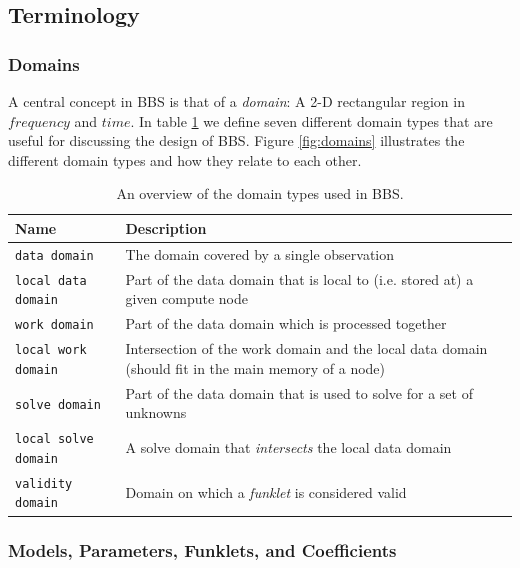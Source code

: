 \documentclass[10pt]{lofar}
\begin{document}
\subsection{Terminology}
\label{subsec:terminology}

\subsubsection{Domains}
\label{subsubsec:domains}

A central concept in BBS is that of a \emph{domain}: A 2-D rectangular region in
$frequency$ and $time$. In table \ref{tab:domains} we define seven different
domain types that are useful for discussing the design of BBS. Figure
\ref{fig:domains} illustrates the different domain types and how they relate to
each other.

\begin{table}[htb!]
\centering
\begin{tabular}{lp{}}
\hline
\textbf{Name} & \textbf{Description}\\
\hline
\texttt{data domain} & The domain covered by a single observation\\
\hline
\texttt{local data domain} & Part of the data domain that is local to (i.e.
stored at) a given compute node\\
\hline
\texttt{work domain} & Part of the data domain which is processed together\\
\hline
\texttt{local work domain} & Intersection of the work domain and the local data
domain (should fit in the main memory of a node)\\
\hline
\texttt{solve domain} & Part of the data domain that is used to solve for a set
of unknowns\\
\hline
\texttt{local solve domain} & A solve domain that \emph{intersects} the local
data domain\\
\hline
\texttt{validity domain} & Domain on which a \emph{funklet} is considered
valid\\
\end{tabular}
\caption{An overview of the domain types used in BBS.}
\label{tab:domains}
\end{table}

\subsubsection{Models, Parameters, Funklets, and Coefficients} 
\label{subsubsec:models-parameters-funklets-coefficients}
\end{document}
